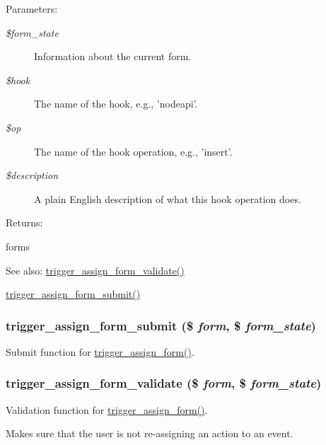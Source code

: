 \begin{Desc}
\item[Parameters:]
\begin{description}
\item[{\em \$form\_\-state}]Information about the current form. \item[{\em \$hook}]The name of the hook, e.g., 'nodeapi'. \item[{\em \$op}]The name of the hook operation, e.g., 'insert'. \item[{\em \$description}]A plain English description of what this hook operation does. \end{description}
\end{Desc}
\begin{Desc}
\item[Returns:]\end{Desc}
forms \begin{Desc}
\item[See also:]\hyperlink{trigger_8admin_8inc_b8f232934437a99af0903a397c090934}{trigger\_\-assign\_\-form\_\-validate()} 

\hyperlink{trigger_8admin_8inc_53539d67f577fc171251efbd969d5d67}{trigger\_\-assign\_\-form\_\-submit()} \end{Desc}
\hypertarget{trigger_8admin_8inc_53539d67f577fc171251efbd969d5d67}{
\subsubsection[{trigger\_\-assign\_\-form\_\-submit}]{\setlength{\rightskip}{0pt plus 5cm}trigger\_\-assign\_\-form\_\-submit (\$ {\em form}, \/  \$ {\em form\_\-state})}}
\label{trigger_8admin_8inc_53539d67f577fc171251efbd969d5d67}


Submit function for \hyperlink{trigger_8admin_8inc_cf100bfaaa96b66189c785d7a7d54dae}{trigger\_\-assign\_\-form()}. \hypertarget{trigger_8admin_8inc_b8f232934437a99af0903a397c090934}{
\subsubsection[{trigger\_\-assign\_\-form\_\-validate}]{\setlength{\rightskip}{0pt plus 5cm}trigger\_\-assign\_\-form\_\-validate (\$ {\em form}, \/  \$ {\em form\_\-state})}}
\label{trigger_8admin_8inc_b8f232934437a99af0903a397c090934}


Validation function for \hyperlink{trigger_8admin_8inc_cf100bfaaa96b66189c785d7a7d54dae}{trigger\_\-assign\_\-form()}.

Makes sure that the user is not re-assigning an action to an event. 